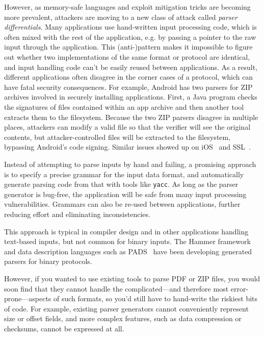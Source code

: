 However, as memory-safe languages and exploit mitigation  tricks are becoming more prevalent,
attackers are moving to a new class of attack called {\em parser differentials}. Many applications use
hand-written input processing code, which is often mixed with the rest of the application, e.g. by
passing a pointer to the raw input through the application. This (anti-)pattern makes it impossible
to figure out whether two implementations of the same format or protocol are identical, and input
handling code can't be easily reused between applications. As a result, different applications often
disagree in the corner cases of a protocol, which can have fatal security consequences. For example,
Android has two parsers for ZIP archives involved in securely installing applications. First, a Java
program checks the signatures of files contained within an app archive and then another tool
extracts them to the filesystem. Because the two ZIP parsers disagree in multiple places, attackers
can modify a valid file so that the verifier will see the original contents, but attacker-controlled
files will be extracted to the filesystem, bypassing Android's code signing. Similar issues showed
up on iOS~\cite{geohot-evasion} and SSL~\cite{DBLP:conf/fc/KaminskyPS10}. 

Instead of attempting to parse inputs by hand and failing, 
a promising approach is to specify
a precise grammar for the input data format, and automatically generate parsing code from that with tools like {\tt yacc}. As long
as the parser generator is bug-free, the application will be safe from many
input processing vulnerabilities. Grammars can also be re-used between
applications, further reducing effort and eliminating inconsistencies.

This approach is typical in compiler design and in other applications handling text-based inputs, but not
common for binary inputs. The Hammer framework~\cite{hammer-parser} and data description languages such as
PADS~\cite{Fisher:2005:PDL:1064978.1065046} have been developing generated parsers for binary protocols.

However, if you wanted to use existing tools to parse PDF
or ZIP files, you would soon find that they cannot handle the complicated---and therefore most
error-prone---aspects of such formats, so you'd still have to
hand-write the riskiest bits of code. For example, existing parser generators cannot conveniently represent size or offset fields, and more complex features, such as data compression or checksums, cannot be expressed at all.

